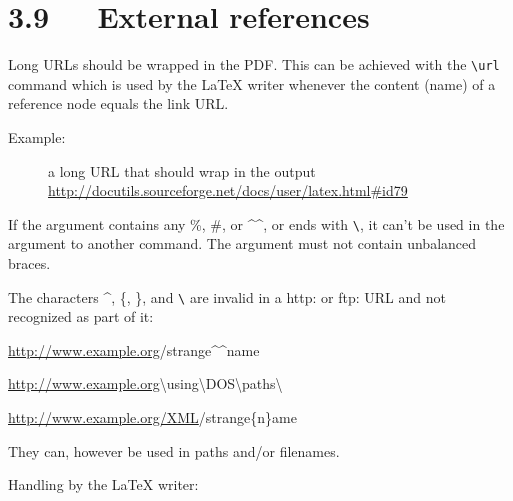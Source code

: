 \documentclass[a4paper]{memoir}
\newenvironment{DUlineblock}[1]{%
    \list{}{\setlength{\partopsep}{\parskip}
            \addtolength{\partopsep}{\baselineskip}
            \setlength{\topsep}{0pt}
            \setlength{\itemsep}{0.15\baselineskip}
            \setlength{\parsep}{0pt}
            \setlength{\leftmargin}{#1}}
    \raggedright
  }
  {\endlist}
\begin{document}
\section{3.9   External references%
  \label{external-references}%
}

Long URLs should be wrapped in the PDF. This can be achieved with the
\texttt{\textbackslash{}url} command which is used by the LaTeX writer whenever the content
(name) of a reference node equals the link URL.

\begin{description}
\item[{Example:}] 
a long URL that should wrap in the output
\url{http://docutils.sourceforge.net/docs/user/latex.html\#id79}

\end{description}

If the argument contains any \textquotedbl{}\%\textquotedbl{}, \textquotedbl{}\#\textquotedbl{}, or \textquotedbl{}\textasciicircum{}\textasciicircum{}\textquotedbl{}, or ends with \texttt{\textbackslash{}}, it can't
be used in the argument to another command. The argument must not contain
unbalanced braces.

The characters \textasciicircum{}, \{, \}, and \texttt{\textbackslash{}} are invalid in a \textquotedbl{}http:\textquotedbl{} or \textquotedbl{}ftp:\textquotedbl{} URL
and not recognized as part of it:

\begin{DUlineblock}{0em}
\item[] \url{http://www.example.org}/strange\textasciicircum{}\textasciicircum{}name
\item[] \url{http://www.example.org}\textbackslash{}using\textbackslash{}DOS\textbackslash{}paths\textbackslash{}
\item[] \url{http://www.example.org/XML}/strange\{n\}ame
\end{DUlineblock}

They can, however be used in paths and/or filenames.

Handling by the LaTeX writer:
\end{document}
